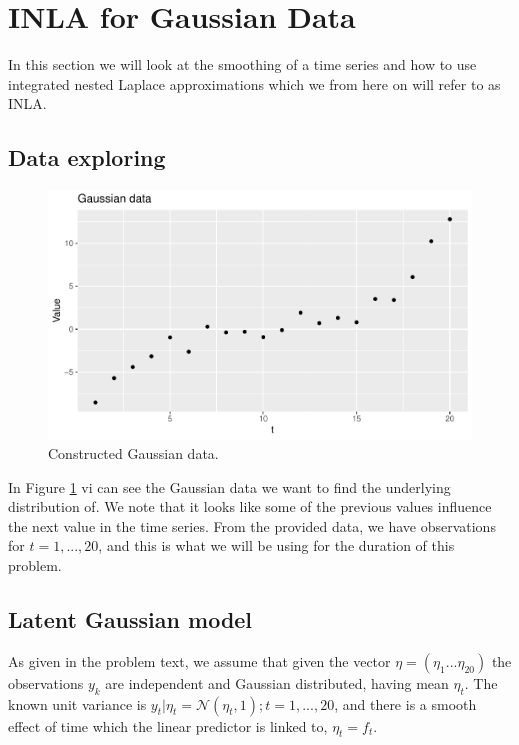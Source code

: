 \section{INLA for Gaussian Data}
In this section we will look at the smoothing of a time series and how to use integrated nested Laplace approximations which we from here on will refer to as INLA.

\subsection{Data exploring}
 
\begin{figure}[h]
    \centering
    \includegraphics[width=\textwidth]{Images/gaussian_data.pdf}
    \caption{Constructed Gaussian data.}
    \label{fig:gaussian_data}
\end{figure}

In Figure \ref{fig:gaussian_data} vi can see the Gaussian data we want to find the underlying distribution of. We note that it looks like some of the previous values influence the next value in the time series. From the provided data, we have observations for $t = 1,...,20$, and this is what we will be using for the duration of this problem. 


\subsection{Latent Gaussian model}

As given in the problem text, we assume that given the vector $\eta = (\eta_1...\eta_{20})$ the observations $y_k$ are independent and Gaussian distributed, having mean $\eta_t$. The known unit variance is $y_t|\eta_t = \mathcal{N}(\eta_t, 1); t = 1,...,20$, and there is a smooth effect of time which the linear predictor is linked to, $\eta_t = f_t$. 

